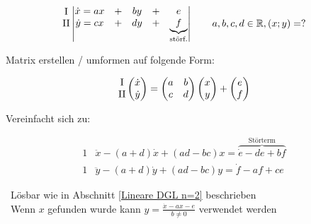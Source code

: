 \newcommand{\RomanNumeralCaps}[1]
{\MakeUppercase{\romannumeral #1}}

\vspace{-0.2cm}

$$
\begin{matrix}
    \text{\RomanNumeralCaps{1}}\\
    \text{\RomanNumeralCaps{2}}\\
    \text{}
\end{matrix}	
\left|
\begin{matrix}
    \dot{x} = ax & + & by & + & e \\
    \dot{y} = cx & + & dy & + &\underbrace{f}_{\text{störf.}} 
\end{matrix}
\right| \qquad a, b, c, d \in \mathbb{R} , (x; y) = ? $$


Matrix erstellen / umformen auf folgende Form:

$$ \begin{matrix}
    \text{\RomanNumeralCaps{1}}\\
    \text{\RomanNumeralCaps{2}}
\end{matrix}
\left(
\begin{matrix}
    \dot{x}\\
    \dot{y}
\end{matrix}
\right)
= 
\left(
\begin{matrix}
    a & b \\
    c & d
\end{matrix}
\right)
\left(
\begin{matrix}
    x\\
    y
\end{matrix}
\right)
+ 
\left(
\begin{matrix}
    e\\
    f
\end{matrix}
\right)
$$


Vereinfacht sich zu:

\vspace{-0.4cm}

\begin{align*}
    1 & \ddot{x} - (a+d)\dot{x} + (ad-bc)x = \overbrace{\dot{e}-de+bf}^{\text{Störterm}}  \\
    1 & \ddot{y} - (a+d)\dot{y} + (ad-bc)y = \dot{f} - af + ce
\end{align*}

\textrightarrow\ Lösbar wie in Abschnitt \ref*{Lineare DGL n=2} beschrieben \\
\textrightarrow\ Wenn $x$ gefunden wurde kann $y = \frac{\dot{x}- ax-e}{b \neq 0}$ verwendet werden

